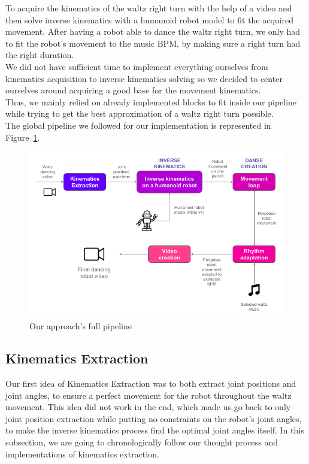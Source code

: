 \documentclass{amsart}
\theoremstyle{definition}
\theoremstyle{plain}
\begin{document}
To acquire the kinematics of the waltz right turn with the help of a video and then solve inverse kinematics with a humanoid robot model to fit the acquired movement. 
After having a robot able to dance the waltz right turn, we only had to fit the robot's movement to the music BPM, by making sure a right turn had the right duration.\\

We did not have sufficient time to implement everything ourselves from kinematics acquisition to inverse kinematics solving so we decided to center ourselves around acquiring a good base for the movement kinematics. \\

Thus, we mainly relied on already implemented blocks to fit inside our pipeline while trying to get the best approximation of a waltz right turn possible.\\

The global pipeline we followed for our implementation is represented in Figure~\ref{fig:pipeline}.

\begin{figure}
  \includegraphics[width = 0.75 \columnwidth]{img/final_solution_pipeline.png}
  \caption{Our approach's full pipeline}\label{fig:pipeline}
\end{figure}

\subsection{Kinematics Extraction}
Our first idea of Kinematics Extraction was to both extract joint positions and joint angles, to ensure a perfect movement for the robot throughout the waltz movement. This idea did not work in the end, which made us go back to only joint position extraction while putting no constraints on the robot's joint angles, to make the inverse kinematics process find the optimal joint angles itself. In this subsection, we are going to chronologically follow our thought process and implementations of kinematics extraction.\\
\end{document}
